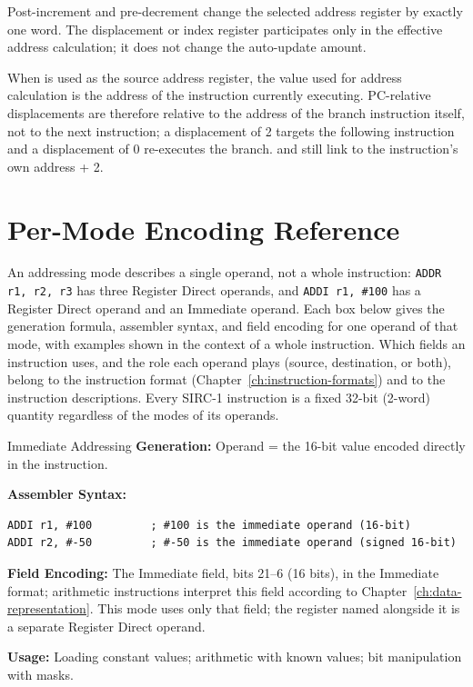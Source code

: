 Post-increment and pre-decrement change the selected address register by exactly one word. The displacement or index
register participates only in the effective address calculation; it does not change the auto-update amount.

When  is used as the source address register, the value used for address calculation is the address of the
instruction currently executing. PC-relative displacements are therefore relative to the address of the branch
instruction itself, not to the next instruction; a displacement of 2 targets the following instruction and a
displacement of 0 re-executes the branch.  and  still link to the instruction's own
address + 2.

\section{Per-Mode Encoding Reference}

An addressing mode describes a single operand, not a whole instruction: \texttt{ADDR r1, r2, r3} has three Register
Direct operands, and \texttt{ADDI r1, \#100} has a Register Direct operand and an Immediate operand. Each box below
gives the generation formula, assembler syntax, and field encoding for one operand of that mode, with examples shown in
the context of a whole instruction. Which fields an instruction uses, and the role each operand plays (source,
destination, or both), belong to the instruction format (Chapter~\ref{ch:instruction-formats}) and to the instruction
descriptions. Every SIRC-1 instruction is a fixed 32-bit (2-word) quantity regardless of the modes of its operands.

\begin{addrmodebox}{Immediate Addressing}
	\textbf{Generation:} Operand = the 16-bit value encoded directly in the instruction.

	\textbf{Assembler Syntax:}
	\begin{lstlisting}
ADDI r1, #100         ; #100 is the immediate operand (16-bit)
ADDI r2, #-50         ; #-50 is the immediate operand (signed 16-bit)
	\end{lstlisting}

	\textbf{Field Encoding:} The Immediate field, bits 21--6 (16 bits), in the Immediate format; arithmetic instructions interpret this field according to Chapter~\ref{ch:data-representation}. This mode uses only that field; the register named alongside it is a separate Register Direct operand.

	\textbf{Usage:} Loading constant values; arithmetic with known values; bit manipulation with masks.
\end{addrmodebox}

